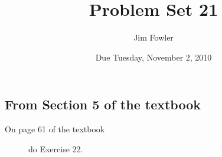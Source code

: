 \documentclass[12pt]{handout}
\author{Jim Fowler}
\title{Problem Set 21}
\date{Due Tuesday, November  2, 2010}
\begin{document}
\maketitle










\subsection*{From Section 5 of the textbook}



\begin{description}

\item[On page 61 of the textbook] do Exercise 22.

\end{description}
\end{document}
